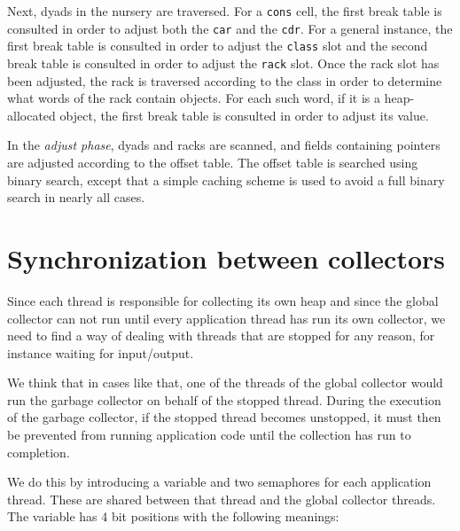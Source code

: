 Next, dyads in the nursery are traversed.  For a \texttt{cons} cell,
the first break table is consulted in order to adjust both the
\texttt{car} and the \texttt{cdr}.  For a general instance, the first
break table is consulted in order to adjust the \texttt{class} slot
and the second break table is consulted in order to adjust the
\texttt{rack} slot.  Once the rack slot has been adjusted, the rack is
traversed according to the class in order to determine what words of
the rack contain \commonlisp{} objects.  For each such word, if it is
a heap-allocated object, the first break table is consulted in order
to adjust its value.

In the \emph{adjust phase}, dyads and racks are scanned, and fields
containing pointers are adjusted according to the offset table.  The
offset table is searched using binary search, except that a simple
caching scheme is used to avoid a full binary search in nearly all
cases.

\section{Synchronization between collectors}
\label{sec-garbage-collection-synchronization-between-collectors}

Since each thread is responsible for collecting its own heap and since
the global collector can not run until every application thread has
run its own collector, we need to find a way of dealing with threads
that are stopped for any reason, for instance waiting for
input/output.

We think that in cases like that, one of the threads of the global
collector would run the garbage collector on behalf of the stopped
thread.  During the execution of the garbage collector, if the stopped
thread becomes unstopped, it must then be prevented from running
application code until the collection has run to completion.

We do this by introducing a variable and two semaphores for each
application thread. These are shared between that thread and the global
collector threads.  The variable has 4 bit positions with the
following meanings:

